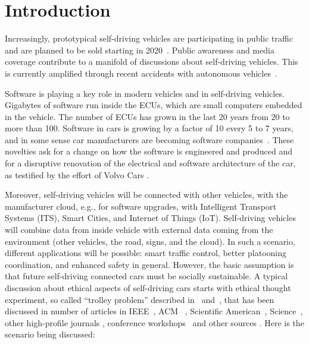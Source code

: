 \section{Introduction}


Increasingly, prototypical self-driving vehicles are participating in public traffic~\cite{Persson2014} and are planned to be sold starting in 2020~\cite{Toyota2015,Stoll_WSJ_2016}. Public awareness and media coverage contribute to a manifold of discussions about self-driving vehicles. This is currently amplified through recent accidents with autonomous vehicles~\cite{Tesla2016_tragicloss,Dolgov2016}. 

Software is playing a key role in modern vehicles and in self-driving vehicles. Gigabytes of software run inside the \acp{ECU}, which are small computers embedded in the vehicle. The number of \acp{ECU} has grown in the last 20 years from 20 to more than 100. Software in cars is growing by a factor of 10 every 5 to 7 years, and in some sense car manufacturers are becoming software companies~\cite{PELLICCIONE201783}. These novelties ask for a change on how the software is engineered and produced and for a disruptive renovation of the electrical and software architecture of the car, as testified by the effort of Volvo Cars \cite{PELLICCIONE201783}.

Moreover, self-driving vehicles will be connected with other vehicles, with the manufacturer cloud, e.g., for software upgrades, with Intelligent Transport Systems (ITS), Smart Cities, and Internet of Things (IoT). Self-driving vehicles will combine data from inside vehicle with external data coming from the environment (other vehicles, the road, signs, and the cloud). In such a scenario, different applications will be possible: smart traffic control, better platooning coordination, and enhanced safety in general.
However, the basic assumption is that future self-driving connected cars must be socially sustainable.
A typical discussion about ethical aspects of self-driving cars starts with ethical thought experiment, so called \enquote{trolley problem} described in~\cite{Foot1967} and~\cite{Wintersberger2017}, that has been discussed in number of articles in IEEE~\cite{7948873,Goodall2016,Ackerman2016}, ACM~ \cite{McBride:2016:EDC:2874239.2874265,Kirkpatrick:2015:MCD:2808213.2788477,Frison:2016:FPT:3004323.3004336}, Scientific American~\cite{Greenemeier2016,Deamer2016,Kuchinskas2013}, Science~\cite{Bonnefon2016,Greene2016_1514}, other high-profile journals \cite{2016arXiv160608813G_GoodmanFlaxman, Coca-Vila2017, goodall2014vehicle}, conference workshops~\cite{Riener:2016:WEI:3004323.3005687,Alavi:2017:DCW:3064857.3079155} and other sources \cite{MoralMachine2016,Mooney2016,Achenbach2015,Shashkevich2017}. Here is the  scenario being discussed:

